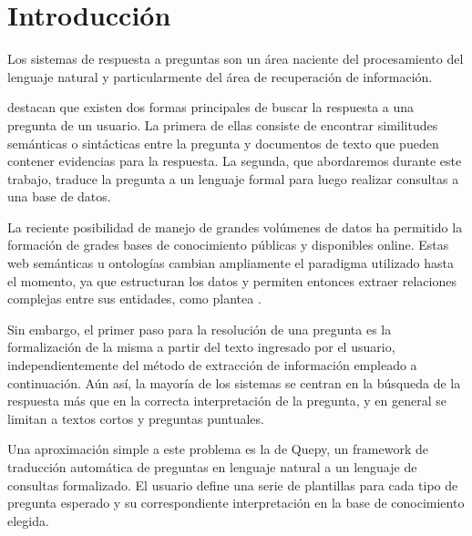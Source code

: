 \chapter{Introducción}

Los sistemas de respuesta a preguntas son un área naciente del procesamiento del lenguaje natural y particularmente del área de recuperación de información.

\citet{gupta_survey} destacan que existen dos formas principales de buscar la respuesta a una pregunta de un usuario. La primera de ellas consiste de encontrar similitudes semánticas o sintácticas entre la pregunta y documentos de texto que pueden contener evidencias para la respuesta. La segunda, que abordaremos durante este trabajo, traduce la pregunta a un lenguaje formal para luego realizar consultas a una base de datos.

La reciente posibilidad de manejo de grandes volúmenes de datos ha permitido la formación de grades bases de conocimiento públicas y disponibles online. Estas web semánticas u ontologías cambian ampliamente el paradigma utilizado hasta el momento, ya que estructuran los datos y permiten entonces extraer relaciones complejas entre sus entidades, como plantea \citet{ou_entailement}.

Sin embargo, el primer paso para la resolución de una pregunta es la formalización de la misma a partir del texto ingresado por el usuario, independientemente del método de extracción de información empleado a continuación. Aún así, la mayoría de los sistemas se centran en la búsqueda de la respuesta más que en la correcta interpretación de la pregunta, y en general se limitan a textos cortos y preguntas puntuales.

Una aproximación simple a este problema es la de Quepy, un framework de traducción automática de preguntas en lenguaje natural a un lenguaje de consultas formalizado. El usuario define una serie de plantillas para cada tipo de pregunta esperado y su correspondiente interpretación en la base de conocimiento elegida. 

